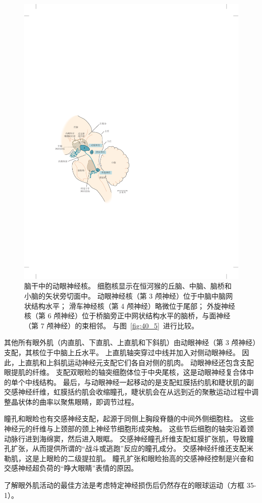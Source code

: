 \begin{figure}[htbp]
	\centering
	\includegraphics[width=0.5\linewidth]{chap35/fig_35_3}
	\caption{脑干中的动眼神经核。
		细胞核显示在恒河猴的丘脑、中脑、脑桥和小脑的矢状旁切面中。
		动眼神经核（第 3 颅神经）位于中脑中脑网状结构水平；
		滑车神经核（第 4 颅神经）略微位于尾部；
		外旋神经核（第 6 颅神经）位于桥脑旁正中网状结构水平的脑桥，与面神经（第 7 颅神经）的束相邻\cite{henn1982primate}。 
		与图~\ref{fig:40_5}~进行比较。}
	\label{fig:35_3}
\end{figure}


其他所有眼外肌（内直肌、下直肌、上直肌和下斜肌）由动眼神经（第 3 颅神经）支配，其核位于中脑上丘水平。
上直肌轴突穿过中线并加入对侧动眼神经。
因此，上直肌和上斜肌运动神经元支配它们各自对侧的肌肉。
动眼神经还包含支配眼提肌的纤维。
支配双眼睑的轴突细胞体位于中央尾核，这是动眼神经复合体中的单个中线结构。
最后，与动眼神经一起移动的是支配虹膜括约肌和睫状肌的副交感神经纤维，虹膜括约肌会收缩瞳孔，睫状肌会在从远到近的聚散运动过程中调整晶状体的曲率以聚焦眼睛，即调节过程。


瞳孔和眼睑也有交感神经支配，起源于同侧上胸段脊髓的中间外侧细胞柱。
这些神经元的纤维与上颈部的颈上神经节细胞形成突触。
这些节后细胞的轴突沿着颈动脉行进到海绵窦，然后进入眼眶。
交感神经瞳孔纤维支配虹膜扩张肌，导致瞳孔扩张，从而提供所谓的“战斗或逃跑”反应的瞳孔成分。
交感神经纤维还支配米勒肌，这是上眼睑的二级提拉肌。
瞳孔扩张和眼睑抬高的交感神经控制是兴奋和交感神经超负荷的“睁大眼睛”表情的原因。



了解眼外肌活动的最佳方法是考虑特定神经损伤后仍然存在的眼球运动（方框 35-1）。


